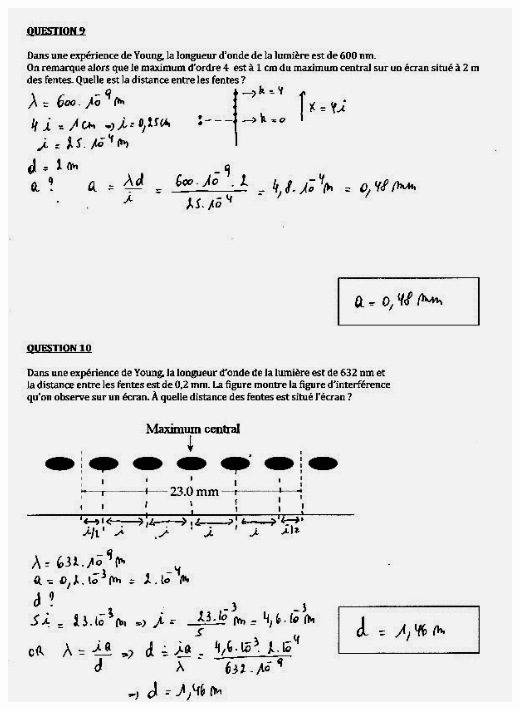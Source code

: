 \includegraphics[width=18.503cm,height=25.456cm]{Pictures/100000010000025F00000343D486BB66DF721C0E.png}
